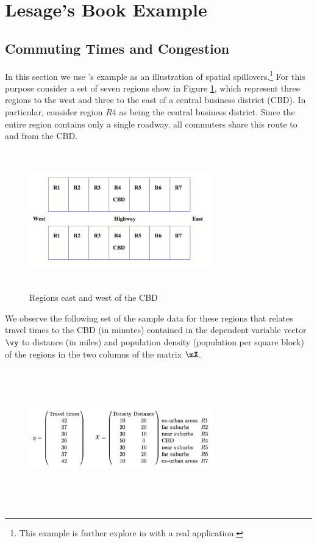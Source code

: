 \documentclass[english,12pt]{book}\usepackage[]{graphicx}\usepackage[]{xcolor}
\begin{document}
\section{Lesage's Book Example}\label{sec:lesage-example}

\subsection{Commuting Times and Congestion}

In this section we use \cite{lesage2010introduction}'s example as an illustration of spatial spillovers.\footnote{This example is further explore in \cite{kirby2009changes} with a real application.} For this purpose consider a set of seven regions show in Figure \ref{fig:lesage-example}, which represent three regions to the west and three to the east of a central business district (CBD). In particular, consider region $R4$ as being the central business district. Since the entire region contains only a single roadway, all commuters share this route to and from the CBD.


\begin{figure}[ht]
\caption{Regions east and west of the CBD}\label{fig:lesage-example}
		    \centering 
		      \includegraphics[width = 8cm, height=6cm]{figure/lesage.png}
\end{figure}

We observe the following set of the sample data for these regions that relates travel times to the CBD (in minutes) contained in the dependent variable vector $\vy$ to distance (in miles) and population density (population per square block) of the regions in the two columns of the matrix $\mX$.

\begin{figure}[H]
		    \centering 
		      \includegraphics[width = 8cm, height=6cm]{figure/lesage2.png}
\end{figure}	
\end{document}
